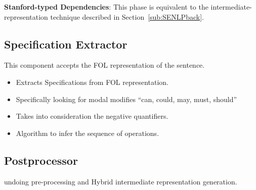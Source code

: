 \textbf{Stanford-typed Dependencies}: This phase is equivalent to the intermediate-representation technique described in Section~\ref{sub:SENLPback}.

\subsection{Specification Extractor}
\label{sub:SE}

This component accepts the FOL representation of the sentence.

\begin{itemize}
\item Extracts Specifications from FOL representation. 
\item Specifically looking for modal modifies ``can, could, may, must, should'' 
\item Takes into consideration the negative quantifiers.
\item Algorithm to infer the sequence of operations.
\end{itemize}


\subsection{Postprocessor}
\label{sub:postpro}
undoing pre-processing and Hybrid intermediate representation generation.



